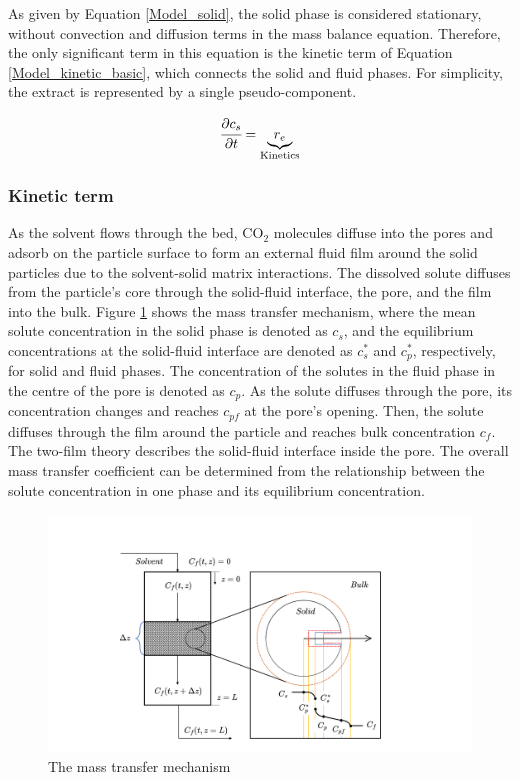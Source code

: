 \documentclass[../Article_Model_Parameters.tex]{subfiles}
\begin{document}
	As given by Equation \ref{Model_solid}, the solid phase is considered stationary, without convection and diffusion terms in the mass balance equation. Therefore, the only significant term in this equation is the kinetic term of Equation \ref{Model_kinetic_basic}, which connects the solid and fluid phases. For simplicity, the extract is represented by a single pseudo-component. 
	
	{\footnotesize
		\begin{equation} 
			\label{Model_solid}
					\cfrac{\partial c_s}{\partial t} = \underbrace{ r_e }_{\text{Kinetics}}
			\end{equation} }
			
			\subsubsection{Kinetic term} \label{CH: Kinetic}
			
			As the solvent flows through the bed, CO$_2$ molecules diffuse into the pores and adsorb on the particle surface to form an external fluid film around the solid particles due to the solvent-solid matrix interactions. The dissolved solute diffuses from the particle's core through the solid-fluid interface, the pore, and the film into the bulk. Figure \ref{fig: SFE_Mechanism} shows the mass transfer mechanism, where the mean solute concentration in the solid phase is denoted as $c_s$, and the equilibrium concentrations at the solid-fluid interface are denoted as $c_s^*$ and $c_p^*$, respectively, for solid and fluid phases. The concentration of the solutes in the fluid phase in the centre of the pore is denoted as $c_p$. As the solute diffuses through the pore, its concentration changes and reaches $c_{pf}$ at the pore's opening. Then, the solute diffuses through the film around the particle and reaches bulk concentration $c_f$. The two-film theory describes the solid-fluid interface inside the pore. The overall mass transfer coefficient can be determined from the relationship between the solute concentration in one phase and its equilibrium concentration.
			
			\begin{figure}[h!]
				\centering
				\includegraphics[trim = 45cm 0cm 60cm 20cm,clip,width=0.85\columnwidth]{Figures/SFE_PFD.drawio.png}	
				\caption{The mass transfer mechanism}
				\label{fig: SFE_Mechanism}
			\end{figure}
			
\end{document}
